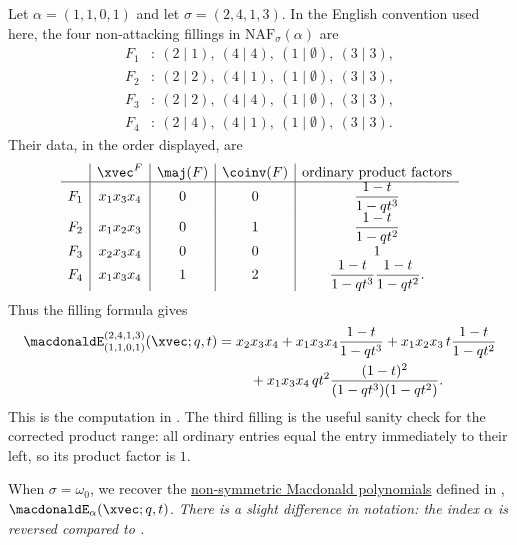 \begin{example}
Let $\alpha=(1,1,0,1)$ and let $\sigma=(2,4,1,3)$.  In the English
convention used here, the four non-attacking fillings in
$\mathrm{NAF}_\sigma(\alpha)$ are
\[
\begin{aligned}
F_1&:\ (2\mid 1),\ (4\mid 4),\ (1\mid \emptyset),\ (3\mid 3),\\
F_2&:\ (2\mid 2),\ (4\mid 1),\ (1\mid \emptyset),\ (3\mid 3),\\
F_3&:\ (2\mid 2),\ (4\mid 4),\ (1\mid \emptyset),\ (3\mid 3),\\
F_4&:\ (2\mid 4),\ (4\mid 1),\ (1\mid \emptyset),\ (3\mid 3).
\end{aligned}
\]
Their data, in the order displayed, are
\[
\begin{array}{c|c|c|c|c}
 & \xvec^F & \maj(F) & \coinv(F) & \text{ordinary product factors} \\ \hline
F_1 & x_1x_3x_4 & 0 & 0 & \dfrac{1-t}{1-qt^3} \\
F_2 & x_1x_2x_3 & 0 & 1 & \dfrac{1-t}{1-qt^2} \\
F_3 & x_2x_3x_4 & 0 & 0 & 1 \\
F_4 & x_1x_3x_4 & 1 & 2 &
  \dfrac{1-t}{1-qt^3}\dfrac{1-t}{1-qt^2}.
\end{array}
\]
Thus the filling formula gives
\[
\begin{aligned}
\macdonaldE^{(2,4,1,3)}_{(1,1,0,1)}(\xvec;q,t)
={}&
x_2x_3x_4
 + x_1x_3x_4\frac{1-t}{1-qt^3}
 + x_1x_2x_3\,t\frac{1-t}{1-qt^2} \\
&\quad
 + x_1x_3x_4\,q t^2
   \frac{(1-t)^2}{(1-qt^3)(1-qt^2)}.
\end{aligned}
\]
This is the computation in \cite[Ex.~2.13]{MouraMandelshtam2025x}.
The third filling is the useful sanity check for the corrected product range:
all ordinary entries equal the entry immediately to their left, so its product
factor is $1$.
\end{example}

When $\sigma = \omega_0$, we recover
the \hyperref[macdonaldE]{non-symmetric Macdonald polynomials}
defined in \cite{HaglundHaimanLoehr2008}, $\macdonaldE_\alpha(\xvec;q,t)$.
\emph{There is a slight difference in notation: the index $\alpha$ is reversed
compared to \cite{HaglundHaimanLoehr2008}.}


